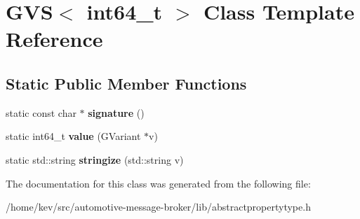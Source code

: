 \hypertarget{classGVS_3_01int64__t_01_4}{\section{G\+V\+S$<$ int64\+\_\+t $>$ Class Template Reference}
\label{classGVS_3_01int64__t_01_4}
}
\subsection*{Static Public Member Functions}
\begin{DoxyCompactItemize}
\item 
\hypertarget{classGVS_3_01int64__t_01_4_a1dc54b2dda69355ec6c037fe0ee28a68}{static const char $\ast$ {\bfseries signature} ()}\label{classGVS_3_01int64__t_01_4_a1dc54b2dda69355ec6c037fe0ee28a68}

\item 
\hypertarget{classGVS_3_01int64__t_01_4_a08ab99b0ab505b2d29e4e954e91f75e0}{static int64\+\_\+t {\bfseries value} (G\+Variant $\ast$v)}\label{classGVS_3_01int64__t_01_4_a08ab99b0ab505b2d29e4e954e91f75e0}

\item 
\hypertarget{classGVS_3_01int64__t_01_4_a66197d92e5c517a97326ccff42e338bb}{static std\+::string {\bfseries stringize} (std\+::string v)}\label{classGVS_3_01int64__t_01_4_a66197d92e5c517a97326ccff42e338bb}

\end{DoxyCompactItemize}


The documentation for this class was generated from the following file\+:\begin{DoxyCompactItemize}
\item 
/home/kev/src/automotive-\/message-\/broker/lib/abstractpropertytype.\+h\end{DoxyCompactItemize}
